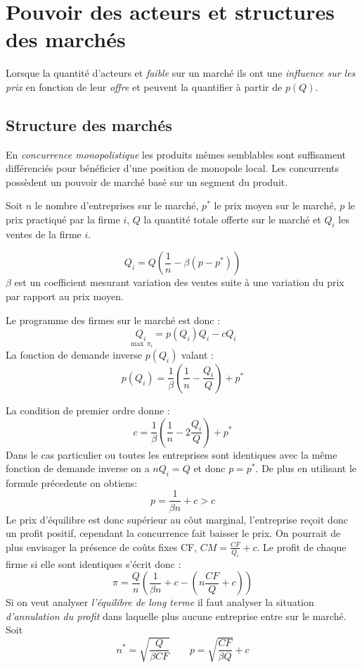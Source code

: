 

\section{Pouvoir des acteurs et structures des marchés} %
\label{sec:pouvoir_des_acteurs_et_structures_des_marches}

Lorsque la quantité d'acteurs et \emph{faible} sur un marché ils ont une \emph{influence sur les prix} en fonction de leur \emph{offre} et peuvent la quantifier à partir de $p(Q)$.

\subsection{Structure des marchés} %
\label{sub:structure_des_marches}

En \emph{concurrence monopolistique} les produits mêmes semblables sont suffisament 
différenciés pour bénéficier d'une position de monopole local. 
Les concurrents possèdent un pouvoir de marché basé sur un segment du produit.
\begin{tcolorbox}[title=Concurrence monopolistique]

Soit $n$ le nombre d'entreprises sur le marché, $p^*$ le prix moyen sur le marché,
$p$ le prix practiqué par la firme $i$, $Q$ la quantité totale offerte sur le marché 
et $Q_i$ les ventes de la firme $i$.

\[
	Q_i= Q\left(\frac{1}{n}-\beta (p-p^*)\right)
\]
$\beta$ est un coefficient mesurant variation des ventes suite à une variation du prix par rapport au prix moyen.

Le programme des firmes sur le marché est donc :
\[
	\underset{\max \, \pi_i}{Q_i}= p(Q_i)Q_i-cQ_i
\]
La fonction de demande inverse $p(Q_i)$ valant : 
\[
	p(Q_i)= \frac{1}{\beta}\left(\frac{1}{n}-\frac{Q_i}{Q}\right)+p^*
\]

La condition de premier ordre donne : 
\[
	c= \frac{1}{\beta}\left(\frac{1}{n}-2\frac{Q_i}{Q}\right)+p^*
\]
Dans le cas particulier ou toutes les entreprises sont identiques avec la même fonction de demande inverse on a $nQ_i=Q$ et donc $p=p^*$. De plus en utilisant le formule précedente on obtiens:
\[
	p=\frac{1}{\beta n}+c >c 
\]
Le prix d'équilibre est donc supérieur au côut marginal, l'entreprise reçoit donc un profit positif, cependant la concurrence fait baisser le prix. On pourrait de plus envisager la présence de coûts fixes CF, $CM=\frac{CF}{Q_i}+c$. Le profit de chaque firme si elle sont identiques s'écrit donc :
\[
	\pi = \frac{Q}{n} \left( \frac{1}{\beta n}+c- \left( n\frac{CF}{Q}+c \right) \right)
\]
Si on veut analyser \emph{l'équilibre de long terme} 
il faut analyser la situation \emph{d'annulation du profit} 
dans laquelle plus aucune entreprise entre sur le marché.
Soit
\[
	n^* = \sqrt{\frac{Q}{\beta CF}} \qquad p=\sqrt{\frac{CF}{\beta Q}}+c
\]
\end{tcolorbox}

